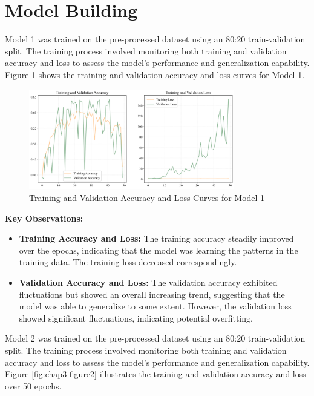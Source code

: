 \section{Model Building}
\label{sec:chap3 section 2}

Model 1 was trained on the pre-processed dataset using an 80:20 train-validation split. The training process involved monitoring both training and validation accuracy and loss to assess the model's performance and generalization capability. Figure \ref{fig:chap3 figure1} shows the training and validation accuracy and loss curves for Model 1.

\begin{figure}[H]
    \centering
    \includegraphics[width=0.8\textwidth]{figures/Figure29.png}
    \caption{Training and Validation Accuracy and Loss Curves for Model 1}
    \label{fig:chap3 figure1}
\end{figure}

\textbf{Key Observations:}
\begin{itemize}
    \item \textbf{Training Accuracy and Loss:} The training accuracy steadily improved over the epochs, indicating that the model was learning the patterns in the training data. The training loss decreased correspondingly.
    \item \textbf{Validation Accuracy and Loss:} The validation accuracy exhibited fluctuations but showed an overall increasing trend, suggesting that the model was able to generalize to some extent. However, the validation loss showed significant fluctuations, indicating potential overfitting.
\end{itemize}

Model 2 was trained on the pre-processed dataset using an 80:20 train-validation split. The training process involved monitoring both training and validation accuracy and loss to assess the model's performance and generalization capability. Figure \ref{fig:chap3 figure2} illustrates the training and validation accuracy and loss over 50 epochs.

